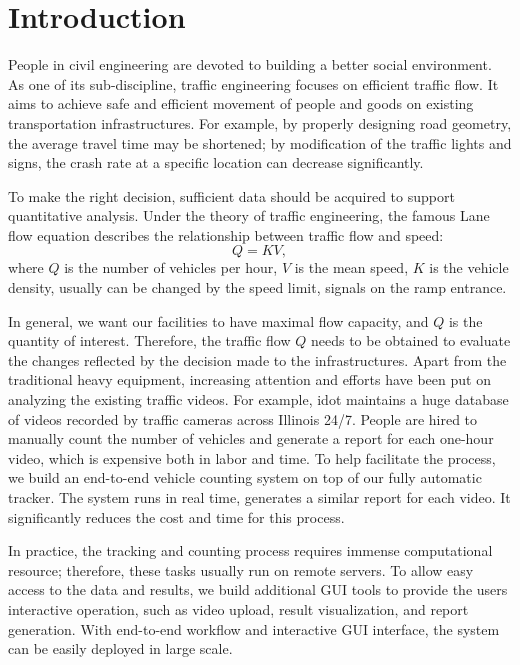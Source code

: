 \section{Introduction}
\label{sec:sys-intro}

People in civil engineering are devoted to building a better social environment.
As one of its sub-discipline, traffic engineering focuses on efficient traffic flow. 
It aims to achieve safe and efficient movement of people and goods on existing transportation infrastructures. 
For example, by properly designing road geometry, the average travel time may be shortened; 
by modification of the traffic lights and signs, the crash rate at a specific location can decrease significantly.

To make the right decision, sufficient data should be acquired to support quantitative analysis.
Under the theory of traffic engineering, the famous Lane flow equation \cite{roess2004traffic} describes the relationship between traffic flow and speed:
$$Q = KV,$$
where $Q$ is the number of vehicles per hour, $V$ is the mean speed, $K$ is the vehicle density, usually can be changed by the speed limit, signals on the ramp entrance. 

In general, we want our facilities to have maximal flow capacity, and $Q$ is the quantity of interest.
Therefore, the traffic flow $Q$ needs to be obtained to evaluate the changes reflected by the decision made to the infrastructures.
Apart from the traditional heavy equipment, increasing attention and efforts have been put on analyzing the existing traffic videos.
For example, \gls{idot} maintains a huge database of videos recorded by traffic cameras across Illinois 24/7. 
People are hired to manually count the number of vehicles and generate a report for each one-hour video, which is expensive both in labor and time.
To help facilitate the process, we build an end-to-end vehicle counting system on top of our fully automatic tracker. 
The system runs in real time, generates a similar report for each video. It significantly reduces the cost and time for this process.

In practice, the tracking and counting process requires immense computational resource; therefore, these tasks usually run on remote servers. 
To allow easy access to the data and results, we build additional GUI tools to provide the users interactive operation, such as video upload, result visualization, and report generation.
With end-to-end workflow and interactive GUI interface, the system can be easily deployed in large scale.